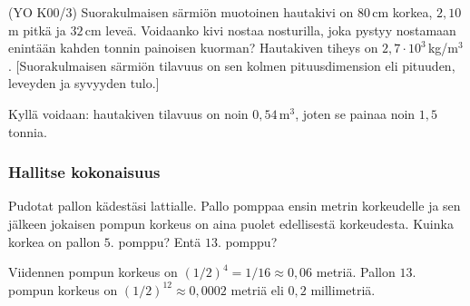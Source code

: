 \begin{tehtavasivu}
\begin{tehtava}
(YO K00/3) Suorakulmaisen särmiön muotoinen hautakivi on $80$\,cm korkea, $2,10$\,m pitkä ja $32$\,cm leveä. Voidaanko kivi nostaa nosturilla, joka pystyy nostamaan enintään kahden tonnin painoisen kuorman? Hautakiven tiheys on $2,7 \cdot 10^3$\,kg/m$^3$. [Suorakulmaisen särmiön tilavuus on sen kolmen pituusdimension eli pituuden, leveyden ja syvyyden tulo.]
\begin{vastaus}
Kyllä voidaan: hautakiven tilavuus on noin $0,54$\,m$^3$, joten se painaa noin $1,5$ tonnia.
\end{vastaus}
\end{tehtava}


\subsubsection*{Hallitse kokonaisuus}

\begin{tehtava}
        Pudotat pallon kädestäsi lattialle. Pallo pomppaa ensin metrin korkeudelle ja sen jälkeen jokaisen pompun korkeus on aina puolet edellisestä korkeudesta. Kuinka korkea on pallon $5$. pomppu? Entä $13$. pomppu?     
        \begin{vastaus}
        Viidennen pompun korkeus on $(1/2)^4=1/16 \approx 0,06$ metriä. Pallon $13$. pompun korkeus on $(1/2)^{12} \approx 0,0002$ metriä eli $0,2$ millimetriä.
        \end{vastaus}
\end{tehtava}


\end{tehtavasivu}
